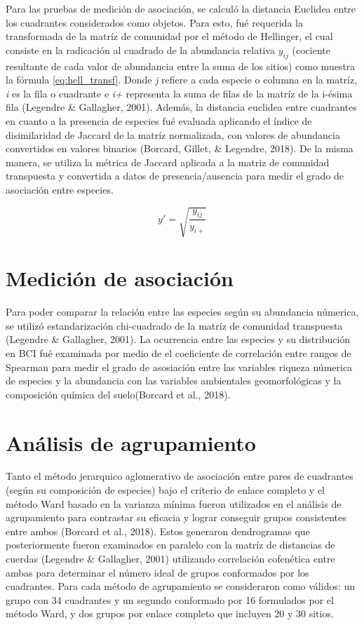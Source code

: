 \documentclass[11pt,]{article}
\begin{document}
Para las pruebas de medición de asociación, se calculó la distancia
Euclidea entre los cuadrantes considerados como objetos. Para esto, fué
requerida la transformada de la matríz de comunidad por el método de
Hellinger, el cual consiste en la radicación al cuadrado de la
abundancia relativa \(y_{ij}\) (cociente resultante de cada valor de
abundancia entre la suma de los sitios) como muestra la fórmula
\ref{eq:hell_transf}. Donde \emph{j} refiere a cada especie o columna en
la matríz, \emph{i} es la fila o cuadrante e \emph{i+} representa la
suma de filas de la matríz de la i-ésima fila (Legendre \& Gallagher,
2001). Además, la distancia euclidea entre cuadrantes en cuanto a la
presencia de especies fué evaluada aplicando el índice de disimilaridad
de Jaccard de la matríz normalizada, con valores de abundancia
convertidos en valores binarios (Borcard, Gillet, \& Legendre, 2018). De
la misma manera, se utiliza la métrica de Jaccard aplicada a la matriz
de comunidad transpuesta y convertida a datos de presencia/ausencia para
medir el grado de asociación entre especies.

\begin{equation} \label{eq:hell_transf}
y' = \sqrt{\frac{y_{ij}}{y_{i+}}}
\end{equation}

\section{Medición de asociación}\label{mediciuxf3n-de-asociaciuxf3n}

Para poder comparar la relación entre las especies según su abundancia
númerica, se utilizó estandarización chi-cuadrado de la matríz de
comunidad transpuesta (Legendre \& Gallagher, 2001). La ocurrencia entre
las especies y su distribución en BCI fué examinada por medio de el
coeficiente de correlación entre rangos de Spearman para medir el grado
de asosiación entre las variables riqueza númerica de especies y la
abundancia con las variables ambientales geomorfológicas y la
composición química del suelo(Borcard et al., 2018).

\section{Análisis de agrupamiento}\label{anuxe1lisis-de-agrupamiento}

Tanto el método jerarquico aglomerativo de asociación entre pares de
cuadrantes (según su composición de especies) bajo el criterio de enlace
completo y el método Ward basado en la varianza mínima fueron utilizados
en el análisis de agrupamiento para contrastar su eficacia y lograr
conseguir grupos consistentes entre ambos (Borcard et al., 2018). Estos
generaron dendrogramas que posteriormente fueron examinados en paralelo
con la matríz de distancias de cuerdas (Legendre \& Gallagher, 2001)
utilizando correlación cofenética entre ambas para determinar el número
ideal de grupos conformados por los cuadrantes. Para cada método de
agrupamiento se consideraron como válidos: un grupo con 34 cuadrantes y
un segundo conformado por 16 formulados por el método Ward, y dos grupos
por enlace completo que incluyen 20 y 30 sitios.
\end{document}
